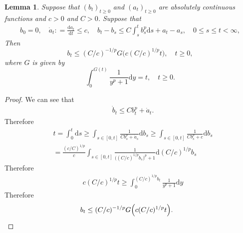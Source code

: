 \documentclass[12pt,a4paper]{amsart}
\numberwithin{equation}{section}
\theoremstyle{plain}
\newtheorem{lemma}[theorem]{Lemma}
\theoremstyle{remark}
\begin{document}
\begin{lemma} \label{thm:T.733}
	Suppose that $(b_t)_{t\geq 0}$ and $(a_t)_{t\geq 0}$ are absolutely continuous functions and $c>0$ and $C>0$. 
	Suppose that
	\begin{align} 
	b_0 =0, \quad \dot a_t : = \frac{\mathrm da_t}{\mathrm dt}\leq c,
	\quad b_t - b_s \leq C \int_s^t b_s^p \mathrm ds + a_t-a_s, \quad 0\leq s\leq t<\infty,
	\end{align}
	Then 
\[
	b_t \leq (C/c)^{-1/p}G\Big(c(C/c)^{1/p}t\Big), \quad t\geq 0,
\]
	where $G$ is given by
\[
	\int_0^{G(t)} \frac{1}{y^p+1}\mathrm dy= t, \quad t\geq 0.
\]
\end{lemma}
\begin{proof}
	We can see that
\begin{align} 
& \dot b_t \leq  C b_t^p + \dot a_t.
\end{align}
	Therefore 
\begin{align} 
& t = \int_0^t \mathrm ds \geq \int_{s\in [0,t]} \frac{1}{Cb_s^p + \dot a_s} \mathrm d b_s
\geq \int_{s\in [0,t]} \frac{1}{Cb_s^p + c} \mathrm d b_s
\\&= \frac{(c/C)^{1/p}}{c}\int_{s\in [0,t]} \frac{1}{\big((C/c)^{1/p}b_s\big)^p + 1} \mathrm d (C/c)^{1/p}b_s
\end{align}
	Therefore
\begin{align} 
& c(C/c)^{1/p} t\geq \int_{0}^{(C/c)^{1/p}b_t} \frac{1}{y^p + 1} \mathrm d y
\end{align}
	Therefore 
\begin{align} 
& b_t \leq (C/c)^{-1/p}G\Big(c(C/c)^{1/p}t\Big). \qedhere
\end{align}
\end{proof}
	
\end{document}
